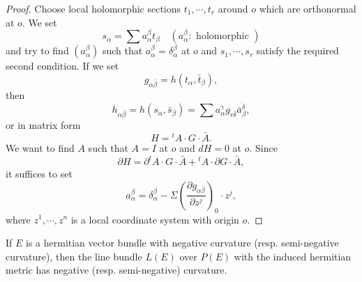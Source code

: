 \documentclass[lang=en,12pt]{beautybook}
\begin{document}
\begin{proof}
  Choose local holomorphic sections $t_1, \cdots, t_r$ around $o$ which are orthonormal at $o$. We set
  \begin{equation*}
    s_\alpha=\sum a_\alpha^\beta t_\beta \quad (a_\alpha^\beta: \text { holomorphic })
  \end{equation*}
  and try to find $\left(a_\alpha^\beta\right)$ such that $a_\alpha^\beta=\delta_\alpha^\beta$ at $o$ and $s_1, \cdots, s_r$ satisfy the required second condition. If we set
  \begin{equation*}
    g_{\alpha \bar{\beta}}=h\left(t_\alpha, \bar{t}_\beta\right),
  \end{equation*}
  then
  \begin{equation*}
    h_{\alpha \bar{\beta}}=h\left(s_\alpha, \bar{s}_\beta\right)=\sum a_\alpha^\gamma g_{r \bar{\delta}} \bar{a}_\beta^{\grave{\delta}},
  \end{equation*}
  or in matrix form
  \begin{equation*}
    H={ }^t A \cdot G \cdot \bar{A} .
  \end{equation*}
  We want to find $A$ such that $A=I$ at $o$ and $d H=0$ at $o$. Since
  \begin{equation*}
    \partial H=\partial^t A \cdot G \cdot \bar{A}+{ }^t A \cdot \partial G \cdot \bar{A},
  \end{equation*}
  it suffices to set
  \begin{equation*}
    a_\alpha^\beta=\delta_\alpha^\beta-\Sigma\left(\frac{\partial g_{\alpha \bar{\beta}}}{\partial z^j}\right)_0 \cdot z^j,
  \end{equation*}
  where $z^1, \cdots, z^n$ is a local coordinate system with origin $o$.
\end{proof}

\begin{proposition}
  If $E$ is a hermitian vector bundle with negative curvature (resp. semi-negative curvature), then the line bundle $L(E)$ over $P(E)$ with the induced hermitian metric has negative (resp. semi-negative) curvature.
\end{proposition}
\end{document}
